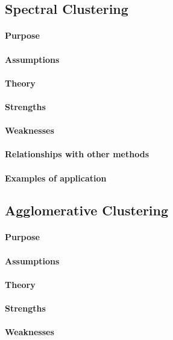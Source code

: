 \subsection{Spectral Clustering}
\paragraph{Purpose}
\paragraph{Assumptions}
\paragraph{Theory}
\paragraph{Strengths}
\paragraph{Weaknesses}
\paragraph{Relationships with other methods}
\paragraph{Examples of application}


\subsection{Agglomerative Clustering}
\paragraph{Purpose}
\paragraph{Assumptions}
\paragraph{Theory}
\paragraph{Strengths}
\paragraph{Weaknesses}

